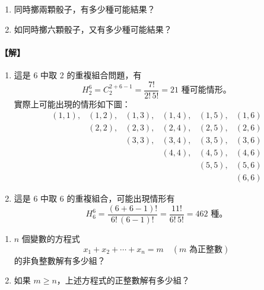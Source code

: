 \medskip
\begin{example}\label{ex:b5-2-17}
\begin{enumerate}[label=(\roman*), topsep=2pt, itemsep=4pt]
  \item 同時擲兩顆骰子，有多少種可能結果？
  \item 如同時擲六顆骰子，又有多少種可能結果？
\end{enumerate}
\end{example}
\paragraph{【解】}
\begin{enumerate}[label=(\roman*), topsep=2pt, itemsep=4pt]
  \item 這是 6 中取 2 的重複組合問題，有
  \[
  H_2^6 = C_2^{2+6-1} = \frac{7!}{2!\, 5!} = 21 \text{ 種可能情形。}
  \]
  實際上可能出現的情形如下圖：
  \[
  \begin{array}{cccccc}
  (1, 1), & (1, 2), & (1, 3), & (1, 4), & (1, 5), & (1, 6) \\
          & (2, 2), & (2, 3), & (2, 4), & (2, 5), & (2, 6) \\
          &         & (3, 3), & (3, 4), & (3, 5), & (3, 6) \\
          &         &         & (4, 4), & (4, 5), & (4, 6) \\
          &         &         &         & (5, 5), & (5, 6) \\
          &         &         &         &         & (6, 6)
  \end{array}
  \]
  \item 這是 6 中取 6 的重複組合，可能出現情形有
  \[
  H_6^6 = \frac{(6+6-1)!}{6!\, (6-1)!} = \frac{11!}{6!\, 5!} = 462 \text{ 種。} \tag*{\#}
  \]
\end{enumerate}

\medskip
\begin{discussion}\label{disc:b5-2-9}
\begin{enumerate}[label=(\roman*), topsep=2pt, itemsep=4pt]
  \item $n$ 個變數的方程式
  \[
  x_1 + x_2 + \cdots + x_n = m \quad (m \text{ 為正整數})
  \]
  的非負整數解有多少組？
  \item 如果 $m \ge n$，上述方程式的正整數解有多少組？
\end{enumerate}
\end{discussion}
